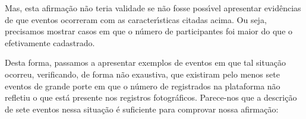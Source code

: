\documentclass[
12pt,		%
openright,	%
twoside,  %
a4paper,			%
chapter=TITLE,		%
english,			%
french,				%
spanish,			%
brazil				%
]{USPSC-classe/USPSC}
\begin{document}
Mas, esta afirma\c{c}\~ao n\~ao teria validade se n\~ao fosse poss\'{\i}vel apresentar evid\^encias de que eventos ocorreram com as caracter\'{\i}sticas citadas acima. Ou seja, precisamos mostrar casos em que o n\'umero de participantes foi maior do que o efetivamente cadastrado.









Desta forma, passamos a apresentar exemplos de eventos em que tal situa\c{c}\~ao ocorreu, verificando, de forma n\~ao exaustiva, que existiram pelo menos sete eventos de grande porte em que o n\'umero de registrados na plataforma n\~ao refletiu o que est\'a presente nos registros fotogr\'aficos. Parece-nos que a descri\c{c}\~ao de sete eventos nessa situa\c{c}\~ao \'e suficiente para comprovar nossa afirma\c{c}\~ao:
\end{document}
